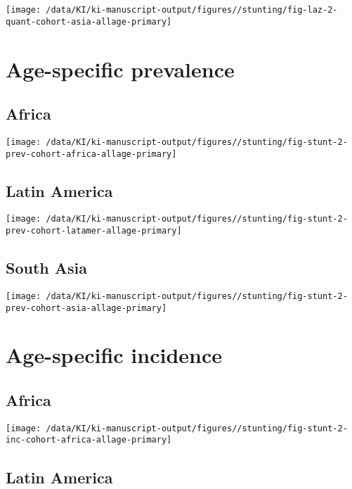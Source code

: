 \documentclass[
  9pt,
]{book}
\begin{document}
\texttt{[image: /data/KI/ki-manuscript-output/figures//stunting/fig-laz-2-quant-cohort-asia-allage-primary]}

\hypertarget{age-specific-prevalence}{%
\section{Age-specific prevalence}\label{age-specific-prevalence}}

\hypertarget{africa-1}{%
\subsection{Africa}\label{africa-1}}

\texttt{[image: /data/KI/ki-manuscript-output/figures//stunting/fig-stunt-2-prev-cohort-africa-allage-primary]}

\hypertarget{latin-america-1}{%
\subsection{Latin America}\label{latin-america-1}}

\texttt{[image: /data/KI/ki-manuscript-output/figures//stunting/fig-stunt-2-prev-cohort-latamer-allage-primary]}

\hypertarget{south-asia-1}{%
\subsection{South Asia}\label{south-asia-1}}

\texttt{[image: /data/KI/ki-manuscript-output/figures//stunting/fig-stunt-2-prev-cohort-asia-allage-primary]}

\hypertarget{age-specific-incidence}{%
\section{Age-specific incidence}\label{age-specific-incidence}}

\hypertarget{africa-2}{%
\subsection{Africa}\label{africa-2}}

\texttt{[image: /data/KI/ki-manuscript-output/figures//stunting/fig-stunt-2-inc-cohort-africa-allage-primary]}

\hypertarget{latin-america-2}{%
\subsection{Latin America}\label{latin-america-2}}
\end{document}
